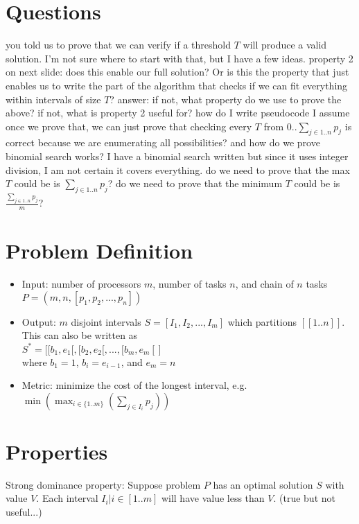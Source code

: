 \documentclass{article}
\begin{document}
\section{Questions}
\begin{outline}
  \1 you told us to prove that we can verify if a threshold $T$ will
  produce a valid solution. I'm not sure where to start with that, but I have
  a few ideas.
  \1 property 2 on next slide: does this enable our full solution? Or is
  this the property that just enables us to write the part of the algorithm
  that checks if we can fit everything within intervals of size $T$?
    \2 answer: 
    \2 if not, what property do we use to prove the above?
    \2 if not, what is property 2 useful for?
  \1 how do I write pseudocode
  \1 I assume once we prove that, we can just prove that checking every 
  $T$ from $0..\sum_{j \in 1..n} p_j$ is correct because we are enumerating
  all possibilities?
  \1 and how do we prove binomial search works? I have a binomial search
  written but since it uses integer division, I am not certain it covers
  everything. 
  \1 do we need to prove that the max $T$ could be is $\sum_{j \in 1..n}
  p_j$?
  \1 do we need to prove that the minimum $T$ could be is $\frac{\sum_{j
  \in 1..n} p_j}{m}$?
\end{outline}

\section{Problem Definition}
\begin{itemize}
  \item Input: number of processors $m$, number of tasks $n$, and chain of
        $n$ tasks $P = (m, n, [p_1, p_2, ..., p_n])$
  \item Output: $m$ disjoint intervals  $S = [I_1, I_2, ..., I_m]$ which
        partitions $[[1..n]]$. This can also be written as 
        \\$S^* = [[b_1,e_1[, [b_2,e_2[, ... , [b_m,e_m[]$ 
        \\where $b_1 = 1$, $b_i = e_{i-1}$, and $e_m = n$
  \item Metric: minimize the cost of the longest interval, e.g.
        $\min(\max_{i\in\{1..m\}}(\sum_{j \in{I_i}} p_j))$
\end{itemize}

\section{Properties}
Strong dominance property: Suppose problem $P$ has an optimal solution $S$
with value $V$. Each interval $I_i | i \in [1..m]$ will have value less than
$V$. (true but not useful...)
\end{document}
